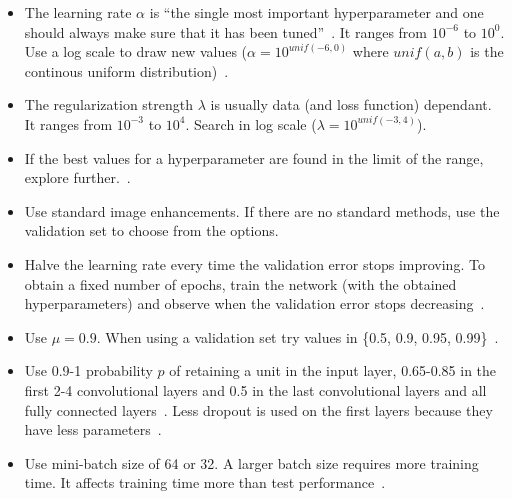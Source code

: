 \begin{itemize}
	\item The learning rate $\alpha$ is ``the single most important hyperparameter and one should always make sure that it has been tuned''~\cite{Bengio2012}. It ranges from $10^{-6}$ to $10^{0}$. Use a log scale to draw new values ($\alpha = 10^{unif(-6, 0)}$ where $unif(a,b)$ is the continous uniform distribution)~\cite{Karpathy2015}.

	\item The regularization strength $\lambda$ is usually data (and loss function) dependant. It ranges from $10^{-3}$ to $10^4$. Search in log scale ($\lambda = 10^{unif(-3, 4)}$).

	\item If the best values for a hyperparameter are found in the limit of the range, explore further.~\cite{Bengio2012}.

	\item Use standard image enhancements. If there are no standard methods, use the validation set to choose from the options.

	\item Halve the learning rate every time the validation error stops improving. To obtain a fixed number of epochs, train the network (with the obtained hyperparameters) and observe when the validation error stops decreasing~\cite{Krizhevsky2012}.

	\item Use $\mu=0.9$. When using a validation set try values in \{0.5, 0.9, 0.95, 0.99\}~\cite{Karpathy2015}.

	\item Use 0.9-1 probability $p$ of retaining a unit in the input layer, 0.65-0.85 in the first 2-4 convolutional layers and 0.5 in the last convolutional layers and all fully connected layers~\cite{Srivastava2014}. Less dropout is used on the first layers because they have less parameters~\cite{Karpathy2015}.

	\item Use mini-batch size of 64 or 32. A larger batch size requires more training time. It affects training time more than test performance~\cite{Bengio2012}.

\end{itemize}



